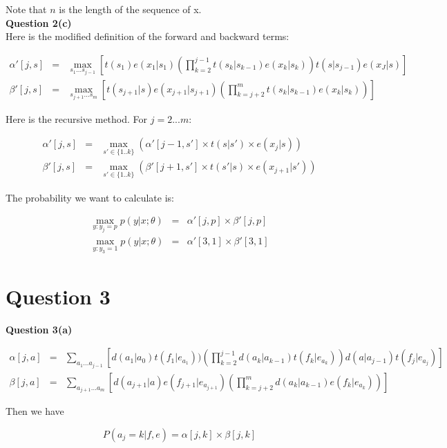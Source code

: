 \documentclass[12pt]{article}
\begin{document}
Note that $n$ is the length of the sequence of x. \\

{\bf Question 2(c)} \\

Here is the modified definition of the forward and backward terms:

\begin{eqnarray*}
\alpha' [j,s] &=&
\max_{s_1...s_{j-1}} [t(s_1)e(x_1|s_1)(\prod^{j-1}_{k=2}
t(s_k|s_{k-1})e(x_k|s_k))t(s|s_{j-1})e(x_J|s)] \\
\beta'[j,s] &=&
\max_{s_{j+1}...s_m}[t(s_{j+1}|s) e(x_{j+1}|s_{j+1}) (\prod^m_{k=j+2}
t(s_k|s_{k-1}) e(x_k|s_k))]
\end{eqnarray*}

Here is the recursive method. For $j = 2...m$:

\begin{eqnarray*}
\alpha' [j,s] &=& \max_{s' \in \{1..k\}} (\alpha'[j-1, s'] \times t(s|s')
\times e(x_j|s)) \\
\beta' [j,s] &=& \max_{s' \in \{1..k\}} (\beta'[j+1, s'] \times t(s'|s)
\times e(x_{j+1}|s'))
\end{eqnarray*}

The probability we want to calculate is:

\begin{eqnarray*}
\max_{y:y_j = p} p(y|x; \theta)
&=& \alpha'[j,p] \times \beta'[j,p] \\
\max_{y:y_3 = 1} p(y|x; \theta)
&=& \alpha'[3,1] \times \beta'[3,1]
\end{eqnarray*}

\section*{Question 3}

{\bf Question 3(a)}

\begin{eqnarray*}
\alpha [j,a] &=& \sum_{a_1...a_{j-1}} [d(a_1|a_0)t(f_1|e_{a_1}))
(\prod^{j-1}_{k=2} d(a_k|a_{k-1}) t(f_k|e_{a_k}))
d(a|a_{j-1})t(f_j|e_{a_j})] \\
\beta [j,a] &=& \sum_{a_{j+1}...a_m}
[d(a_{j+1}|a)e(f_{j+1}|e_{a_{j+1}}) (\prod^m_{k=j+2}
d(a_k|a_{k-1})e(f_k|e_{a_k}))]
\end{eqnarray*}

Then we have

\begin{equation*}
P(a_j=k|f,e) = \alpha [j,k] \times \beta [j,k]
\end{equation*}
\end{document}
